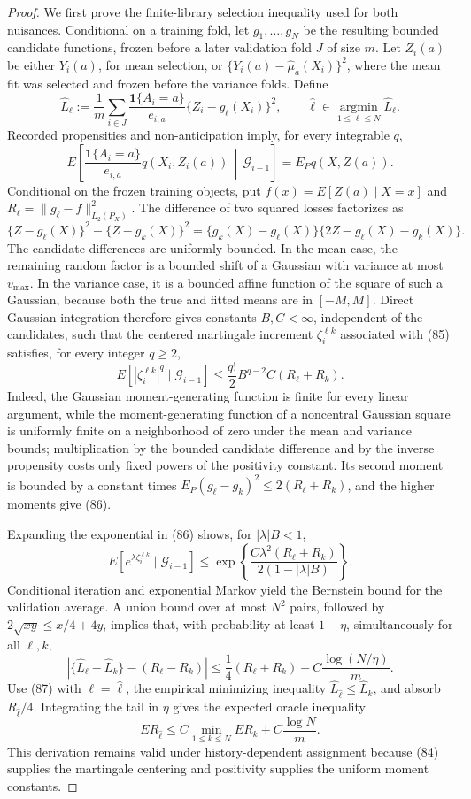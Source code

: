 \documentclass{article}
\begin{document}
\begin{proof}
We first prove the finite-library selection inequality used for both nuisances. Conditional on a training fold, let \(g_1,\ldots,g_N\) be the resulting bounded candidate functions, frozen before a later validation fold \(J\) of size \(m\). Let \(Z_i(a)\) be either \(Y_i(a)\), for mean selection, or \(\{Y_i(a)-\widehat\mu_a(X_i)\}^2\), where the mean fit was selected and frozen before the variance folds. Define
\[
\widehat L_\ell:=\frac1m\sum_{i\in J}
\frac{\mathbf1\{A_i=a\}}{e_{i,a}}
\{Z_i-g_\ell(X_i)\}^2,
\qquad
\widehat\ell\in\operatorname*{argmin}_{1\leq\ell\leq N}\widehat L_\ell.
\tag{83}
\]
Recorded propensities and non-anticipation imply, for every integrable \(q\),
\[
E\!\left[
\frac{\mathbf1\{A_i=a\}}{e_{i,a}}q(X_i,Z_i(a))
\,\middle|\,\mathcal G_{i-1}
\right]
=E_Pq(X,Z(a)).
\tag{84}
\]
Conditional on the frozen training objects, put \(f(x)=E[Z(a)\mid X=x]\) and \(R_\ell=\|g_\ell-f\|_{L_2(P_X)}^2\). The difference of two squared losses factorizes as
\[
\{Z-g_\ell(X)\}^2-\{Z-g_k(X)\}^2
=\{g_k(X)-g_\ell(X)\}\{2Z-g_\ell(X)-g_k(X)\}.
\tag{85}
\]
The candidate differences are uniformly bounded. In the mean case, the remaining random factor is a bounded shift of a Gaussian with variance at most \(v_{\max}\). In the variance case, it is a bounded affine function of the square of such a Gaussian, because both the true and fitted means are in \([-M,M]\). Direct Gaussian integration therefore gives constants \(B,C<\infty\), independent of the candidates, such that the centered martingale increment \(\zeta_i^{\ell k}\) associated with (85) satisfies, for every integer \(q\geq2\),
\[
E[|\zeta_i^{\ell k}|^q\mid\mathcal G_{i-1}]
\leq\frac{q!}{2}B^{q-2}C(R_\ell+R_k).
\tag{86}
\]
Indeed, the Gaussian moment-generating function is finite for every linear argument, while the moment-generating function of a noncentral Gaussian square is uniformly finite on a neighborhood of zero under the mean and variance bounds; multiplication by the bounded candidate difference and by the inverse propensity costs only fixed powers of the positivity constant. Its second moment is bounded by a constant times \(E_P(g_\ell-g_k)^2\leq2(R_\ell+R_k)\), and the higher moments give (86).

Expanding the exponential in (86) shows, for \(|\lambda|B<1\),
\[
E[e^{\lambda\zeta_i^{\ell k}}\mid\mathcal G_{i-1}]
\leq
\exp\!\left\{
\frac{C\lambda^2(R_\ell+R_k)}{2(1-|\lambda|B)}
\right\}.
\]
Conditional iteration and exponential Markov yield the Bernstein bound for the validation average. A union bound over at most \(N^2\) pairs, followed by \(2\sqrt{xy}\leq x/4+4y\), implies that, with probability at least \(1-\eta\), simultaneously for all \(\ell,k\),
\[
\left|\{\widehat L_\ell-\widehat L_k\}-(R_\ell-R_k)\right|
\leq\frac14(R_\ell+R_k)
+C\frac{\log(N/\eta)}m.
\tag{87}
\]
Use (87) with \(\ell=\widehat\ell\), the empirical minimizing inequality \(\widehat L_{\widehat\ell}\leq\widehat L_k\), and absorb \(R_{\widehat\ell}/4\). Integrating the tail in \(\eta\) gives the expected oracle inequality
\[
E R_{\widehat\ell}
\leq C\min_{1\leq k\leq N}ER_k
+C\frac{\log N}{m}.
\tag{88}
\]
This derivation remains valid under history-dependent assignment because (84) supplies the martingale centering and positivity supplies the uniform moment constants.


\end{proof}
\end{document}

